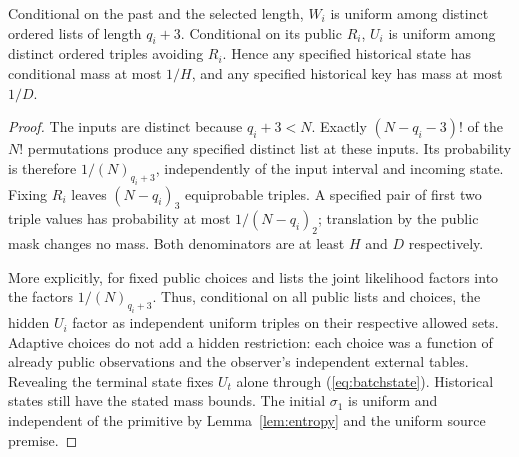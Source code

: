 \documentclass[journal=tosc,preprint,floatrow,nohyperxmp]{iacrtrans}
\newif\ifjordireview
\newcounter{jordinote}
\newcommand{\jordinote}[2]{%
  \ifjordireview
  \stepcounter{jordinote}\par\medskip\noindent
  \fcolorbox{blue!55!black}{blue!4}{%
    \begin{minipage}{\dimexpr\linewidth-2\fboxsep-2\fboxrule\relax}
    \small\raggedright\color{blue!45!black}
    \textbf{Solo Jordi -- J\thejordinote: #1}\par\smallskip
    #2
    \end{minipage}}\par\medskip
  \fi
}
\numberwithin{lemma}{section}
\numberwithin{proposition}{section}
\newcommand{\fall}[2]{(#1)_{#2}}
\numberwithin{equation}{section}
\theoremstyle{definition}
\numberwithin{definition}{section}
\theoremstyle{plain}
\begin{document}
\begin{lemma}\label{lem:batch}
Conditional on the past and the selected length, $W_i$ is uniform among distinct ordered lists of length $q_i+3$. Conditional on its public $R_i$, $U_i$ is uniform among distinct ordered triples avoiding $R_i$. Hence any specified historical state has conditional mass at most $1/H$, and any specified historical key has mass at most $1/D$.
\end{lemma}
\begin{proof}
The inputs are distinct because $q_i+3<N$. Exactly $(N-q_i-3)!$ of the $N!$ permutations produce any specified distinct list at these inputs. Its probability is therefore $1/\fall{N}{q_i+3}$, independently of the input interval and incoming state. Fixing $R_i$ leaves $\fall{N-q_i}{3}$ equiprobable triples. A specified pair of first two triple values has probability at most $1/\fall{N-q_i}{2}$; translation by the public mask changes no mass. Both denominators are at least $H$ and $D$ respectively.

More explicitly, for fixed public choices and lists the joint likelihood factors into the factors $1/\fall{N}{q_i+3}$. Thus, conditional on all public lists and choices, the hidden $U_i$ factor as independent uniform triples on their respective allowed sets. Adaptive choices do not add a hidden restriction: each choice was a function of already public observations and the observer's independent external tables. Revealing the terminal state fixes $U_t$ alone through (\ref{eq:batchstate}). Historical states still have the stated mass bounds. The initial $\sigma_1$ is uniform and independent of the primitive by Lemma~\ref{lem:entropy} and the uniform source premise.
\end{proof}

\jordinote{Punto crítico del apéndice: condicionamientos}{Aquí conviene revisar la factorización con calma: qué variables quedan ocultas después de fijar transcripción, controles, tablas externas y estado terminal. La última terna está determinada por el compromiso y debe tratarse aparte. El argumento necesita que las decisiones públicas dependan solo del historial observado; no basta invocar independencia de permutaciones sin comprobar qué condicionamientos la conservan.}

\end{document}
